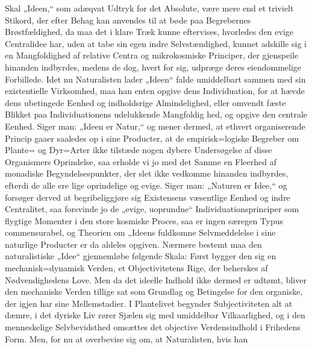 \documentclass[12pt]{book}
\newcommand{\opage}[1]{\marginnote{\footnotesize\textit{[#1]}}}
\begin{document}
Skal „Ideen,“ som adæqvat Udtryk for det Absolute, være mere end et trivielt Stikord, der
efter Behag kan anvendes til at bøde paa Begrebernes Brøstfældighed, da maa det i klare Træk
kunne eftervises, hvorledes den evige Centralidee har, uden at tabe sin egen indre
Selvstændighed, kunnet adskille sig i en Mangfoldighed af relative Centra og mikrokosmiske
Principer, der gjenspeile hinanden indbyrdes, medens de dog, hvert for sig, udpræge deres
eiendommelige Forbillede. Idet nu Naturalisten lader „Ideen“ falde umiddelbart sammen med
sin existentielle Virksomhed, maa han enten opgive dens Individuation, for at hævde dens
ubetingede Eenhed og indholdsrige Almindelighed, eller omvendt fæste Blikket paa
Individuationens udelukkende Mangfoldig
\opage{223} hed, og opgive den centrale Eenhed. Siger man: „Ideen er Natur,“ og mener dermed, at ethvert
organiserende Princip gaaer saaledes op i sine Producter, at de empirisk=logiske Begreber om
Plante= og Dyr=Arter ikke tilstæde nogen dybere Undersøgelse af disse Organismers
Oprindelse, saa erholde vi jo med det Samme en Fleerhed af monadiske Begyndelsespunkter, der
slet ikke vedkomme hinanden indbyrdes, efterdi de alle ere lige oprindelige og evige. Siger
man: „Naturen er Idee,“ og forsøger derved at begribeliggjøre sig Existensens væsentlige
Eenhed og indre Centralitet, saa forsvinde jo de „evige, uoprundne“ Individuationsprinciper
som flygtige Momenter i den store kosmiske Proces, saa er ingen særegen Typus commensurabel,
og Theorien om „Ideens fuldkomne Selvmeddelelse i sine naturlige Producter er da aldeles
opgiven.
Nærmere bestemt maa den naturalistiske „Idee“ gjennemløbe følgende Skala: Først bygger den
sig en mechanisk=dynamisk Verden, et Objectivitetens Rige, der beherskes af Nødvendighedens
Love. Men da det ideelle Indhold ikke dermed er udtømt, bliver den mechaniske Verden tillige
sat som Grundlag og Betingelse for den organiske, der igjen har sine Mellemstadier. I
Plantelivet begynder Subjectiviteten alt at dæmre, i det dyriske Liv rører Sjælen sig med
umiddelbar Vilkaarlighed, og i den menneskelige Selvbevidsthed omsættes det objective
Verdensindhold i Frihedens Form. Men, for nu at overbevise sig om, at Naturalisten, hvis han
\end{document}

